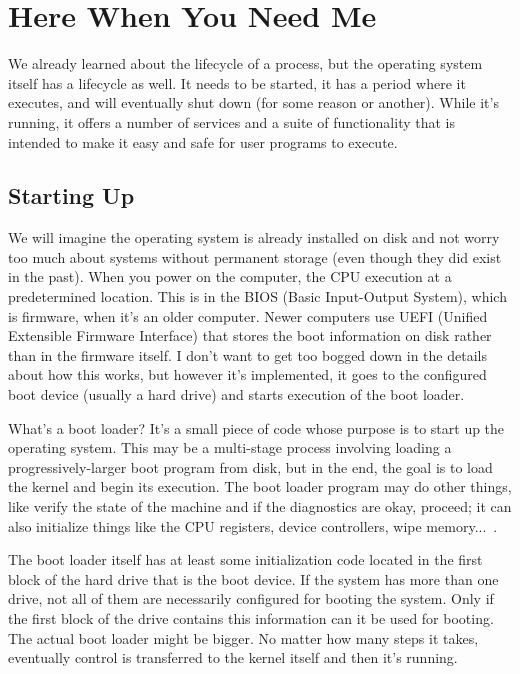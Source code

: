 




\section*{Here When You Need Me}

We already learned about the lifecycle of a process, but the operating system itself has a lifecycle as well. It needs to be started, it has a period where it executes, and will eventually shut down (for some reason or another). While it's running, it offers a number of services and a suite of functionality that is intended to make it easy and safe for user programs to execute.

\subsection*{Starting Up}
We will imagine the operating system is already installed on disk and not worry too much about systems without permanent storage (even though they did exist in the past). When you power on the computer, the CPU execution at a predetermined location. This is in the BIOS (Basic Input-Output System), which is firmware, when it's an older computer. Newer computers use  UEFI (Unified Extensible Firmware Interface) that stores the boot information on disk rather than in the firmware itself. I don't want to get too bogged down in the details about how this works, but however it's implemented, it goes to the configured boot device (usually a hard drive)  and starts execution of the boot loader. 

What's a boot loader? It's a small piece of code whose purpose is to start up the operating system. This may be a multi-stage process involving loading a progressively-larger boot program from disk, but in the end, the goal is to load the kernel and begin its execution. The boot loader program may do other things, like verify the state of the machine and if the diagnostics are okay, proceed; it can also initialize things like the CPU registers, device controllers, wipe memory...~\cite{osc}.

The boot loader itself has at least some initialization code located in the first block of the hard drive that is the boot device. If the system has more than one drive, not all of them are necessarily configured for booting the system. Only if the first block of the drive contains this information can it be used for booting. The actual boot loader might be bigger. No matter how many steps it takes, eventually control is transferred to the kernel itself and then it's running. 

